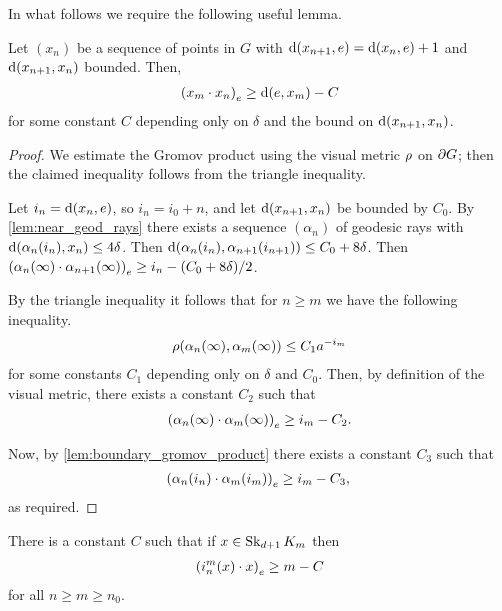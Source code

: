 \documentclass[a4paper]{article}
\begin{document}
In what follows we require the following useful lemma.

\begin{lemma}\label{lem:useful}
  Let $(x_n)$ be a sequence of points in $G$ with $\dist(x_{n+1}, e) = 
  \dist(x_n, e) + 1$ and $\dist(x_{n+1}, x_n)$ bounded. Then,
  \begin{align*}
    \gromov{e}{x_m}{x_n} \geq \dist(e,x_m) - C
  \end{align*}
  for some constant $C$ depending only on $\delta$ and the bound on 
  $\dist(x_{n+1}, x_n)$.
\end{lemma}

\begin{proof}
  We estimate the Gromov product using the visual metric $\vdistance$ on 
  $\boundary G$; then the claimed inequality follows from the triangle 
  inequality. 
  
  Let $i_n = \dist(x_n, e)$, so $i_n = i_0 + n$, and let 
  $\dist(x_{n+1},x_n)$ be bounded by $C_0$. By 
  \cref{lem:near_geod_rays} there exists a sequence $(\alpha_n)$ of 
  geodesic rays with $\dist(\alpha_n(i_n), x_n) \leq 4\delta$. Then 
  $\dist(\alpha_n(i_n), \alpha_{n+1}(i_{n+1})) \leq C_0 + 8\delta$. Then 
  $\gromov{e}{\alpha_n(\infty)}{ \alpha_{n+1}(\infty)} \geq i_n - (C_0 + 
  8\delta)/2$.

  By the triangle inequality it follows that for $n\geq m$ we have the following 
  inequality.
  \begin{align*}
    \vdistance(\alpha_n(\infty), \alpha_m(\infty)) \leq C_1 a^{-i_m}
  \end{align*}
  for some constants $C_1$ depending only on $\delta$ and $C_0$. Then, by
  definition of the visual metric, there exists a constant $C_2$ such that
  \begin{align*}
    \gromov{e}{\alpha_n(\infty)}{\alpha_m(\infty)} \geq i_m - C_2.
  \end{align*}

  Now, by \cref{lem:boundary_gromov_product} there exists a constant $C_3$ such
  that
  \begin{align*}
    \gromov{e}{\alpha_n(i_n)}{\alpha_m(i_m)} \geq i_m - C_3,\qedhere
  \end{align*}
  as required.
\end{proof}

\begin{lemma}\label{lem:linearproduct}
  There is a constant $C$ such that if $x \in \Skel_{d+1} K_m$ then
  \begin{align*}
    \gromov{e}{i^m_n(x)}{x} \geq m - C
  \end{align*}
  for all $n\geq m\geq n_0$.
\end{lemma}
\end{document}
